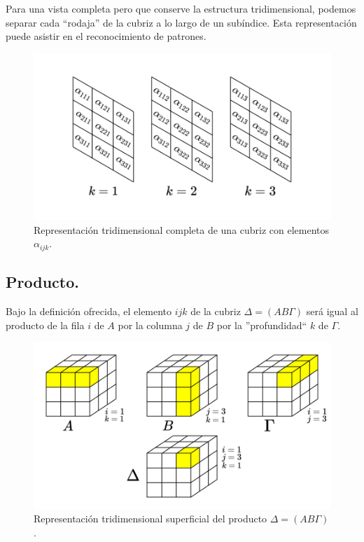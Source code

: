 \documentclass[a4paper, titlepage]{article}
\begin{document}
Para una vista completa pero que conserve la estructura tridimensional, podemos separar cada ``rodaja'' de la cubriz a lo largo de un subíndice. Esta representación puede asistir en el reconocimiento de patrones.

\begin{figure}[H]
	\includegraphics[width=\linewidth]{tridimensional_comp.png}
	\caption{Representación tridimensional completa de una cubriz con elementos $\alpha_{ijk}$.}
\end{figure}

\subsection{Producto.}

Bajo la definición ofrecida, el elemento $ijk$ de la cubriz $\Delta = (AB\Gamma)$ será igual al producto de la fila $i$ de $A$ por la columna $j$ de $B$ por la ''profundidad`` $k$ de $\Gamma$.

\begin{figure}[H]
	\includegraphics[width=\linewidth]{product.png}
	\caption{Representación tridimensional superficial del producto $\Delta = (AB\Gamma)$.}
\end{figure}
\end{document}
